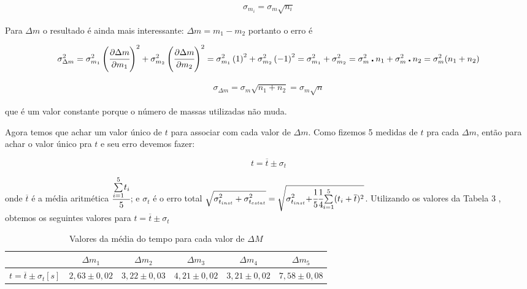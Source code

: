 \documentclass[a4paper]{article}
\providecommand{\tabularnewline}{\\} %
\begin{document}
\begin{align}
\sigma_{m_{i}}=\sigma_{m}\sqrt{n_{i}}
\end{align}

Para $\Delta m$ o resultado é ainda mais interessante: $\Delta m=m_{1}-m_{2}$ portanto o erro é 

$$\sigma_{\Delta m}^{2}=\sigma_{m_{1}}^{2}\left(\cfrac{\partial\Delta m}{\partial m_{1}}\right)^{2}+\sigma_{m_{2}}^{2}\left(\cfrac{\partial\Delta m}{\partial m_{2}}\right)^{2}=\sigma_{m_{1}}^{2}\left(1\right)^{2}+\sigma_{m_{2}}^{2}\left(-1\right)^{2}=\sigma_{m_{1}}^{2}+\sigma_{m_{2}}^{2}=\sigma_{m}^{2}\centerdot n_{1}+\sigma_{m}^{2}\centerdot n_{2}=\sigma_{m}^{2}(n_{1}+n_{2})$$

\begin{align}
\sigma_{\Delta m}=\sigma_{m}\sqrt{n_{1}+n_{2}}=\sigma_{m}\sqrt{n}
\end{align}

que é um valor constante porque o número de massas utilizadas não muda.

Agora temos que achar um valor único de $t$ para associar com cada valor de $\Delta m$. Como fizemos 5 medidas de $t$ pra cada $\Delta m$, então para achar o valor único pra $t$ e seu erro devemos fazer:

$$t=\overline{t}\pm\sigma_{t}$$ 

onde $\overline{t}$ é a média aritmética $\cfrac[r]{\overset{{\scriptstyle 5}}{\underset{{\scriptstyle i=1}}{\sum}}t_{i}}{5}$; e $\sigma_{t}$ é o erro total $\sqrt{{\displaystyle \sigma_{t_{inst}}^{2}+\sigma_{t_{estat}}^{2}}}=\sqrt{{\displaystyle \sigma_{t_{inst}}^{2}+}\cfrac[r]{1}{5}\cfrac[l]{1}{4}\overset{{\scriptstyle 5}}{\underset{{\scriptstyle i=1}}{\sum}}(t_{i}+\overline{t})^{2}}$. Utilizando os valores da Tabela 3 , obtemos os seguintes valores para $t=\overline{t}\pm\sigma_{t}$

\begin{table}[!ht]
	\begin{centering}
	\caption{Valores da média do tempo para cada valor de $\Delta M$}
	\par\end{centering}
	\centering{}%
	\begin{tabular}{|c|c|c|c|c|c|}
	\cline{2-6} 
	\multicolumn{1}{c|}{} & $\Delta m_{1}$ & $\Delta m_{2}$ & $\Delta m_{3}$ & $\Delta m_{4}$ & $\Delta m_{5}$\tabularnewline	\hline
	$t=\overline{t}\pm\sigma_{t}$$[s]$ & $2,63\pm0,02$ & $3,22\pm0,03$ & $4,21\pm0,02$ & $3,21\pm0,02$ & $7,58\pm0,08$\tabularnewline	\hline
	\end{tabular}
\end{table}
\end{document}
